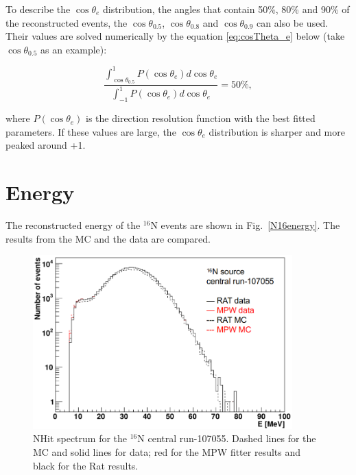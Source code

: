 To describe the $\cos\theta_e$ distribution, the angles that contain 50\%, 80\%
and 90\% of the reconstructed events, the $\cos\theta_{0.5}$, $\cos\theta_{0.8}$ and $\cos\theta_{0.9}$ can also be used. Their values are solved numerically by the equation \ref{eq:cosTheta_e} below (take $\cos\theta_{0.5}$ as an example):

\begin{equation}\label{eq:cosTheta_e}
\frac{\int_{\cos\theta_{0.5}}^1 P(\cos\theta_e) d\cos\theta_e}{\int_{-1}^1 P(\cos\theta_e) d\cos\theta_e} = 50\%,
\end{equation}

where $P(\cos\theta_e)$ is the direction resolution function with the best fitted parameters. If these values are large, the $\cos\theta_e$ distribution is sharper and more peaked around +1.




\section{Energy}

The reconstructed energy of the $^{16}$N events are shown in Fig.~\ref{N16energy}. The results from the MC and the data are compared.
\begin{figure}[htbp]
	\centering
	\includegraphics[width=10cm]{N16_nhits_107055.png}
	\caption{NHit spectrum for the $^{16}$N central run-107055. Dashed lines for the MC and solid lines for data; red for the MPW fitter results and black for the Rat results.}
	\label{N16nhits}
\end{figure}

